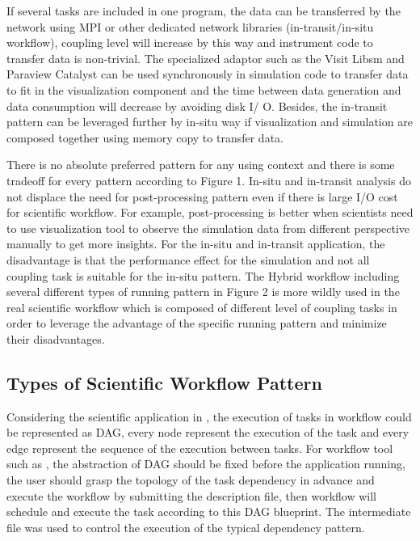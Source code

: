 If several tasks are included in one program, the data can be transferred by the network using MPI or other dedicated network libraries (in-transit/in-situ workflow), coupling level will increase by this way and instrument code to transfer data is non-trivial. The specialized adaptor such as the Visit Libsm \cite{visitlibsm} and Paraview Catalyst  \cite{ayachit2015paraview} can be used synchronously in simulation code to transfer data to fit in the visualization component and the time between data generation and data consumption will decrease by avoiding disk I/ O. Besides, the in-transit pattern can be leveraged further by in-situ way if visualization and simulation are composed together using memory copy to transfer data.

There is no absolute preferred pattern for any using context and there is some tradeoff for every pattern according to Figure 1. In-situ and in-transit analysis do not displace the need for post-processing pattern even if there is large I/O cost for scientific workflow\cite{bauer2016situ}. For example, post-processing is better when scientists need to use visualization tool to observe the simulation data from different perspective manually to get more insights. For the in-situ and in-transit application, the disadvantage is that the performance effect for the simulation and not all coupling task is suitable for the in-situ pattern. The Hybrid workflow including several different types of running pattern in Figure 2 is more wildly used in the real scientific workflow which is composed of different level of coupling tasks in order to leverage the advantage of the specific running pattern and minimize their disadvantages. 

\subsection{Types of Scientific Workflow Pattern}

Considering the scientific application in \cite{makeflowexample}, the execution of tasks in workflow could be represented as DAG, every node represent the execution of the task and every edge represent the sequence of the execution between tasks. For workflow tool such as \cite{makeflowexample,wilde2011swift}, the abstraction of DAG should be fixed before the application running, the user should grasp the topology of the task dependency in advance and execute the workflow by submitting the description file, then workflow will schedule and execute the task according to this DAG blueprint. The intermediate file was used to control the execution of the typical dependency pattern\cite{bharathi2008characterization}.


